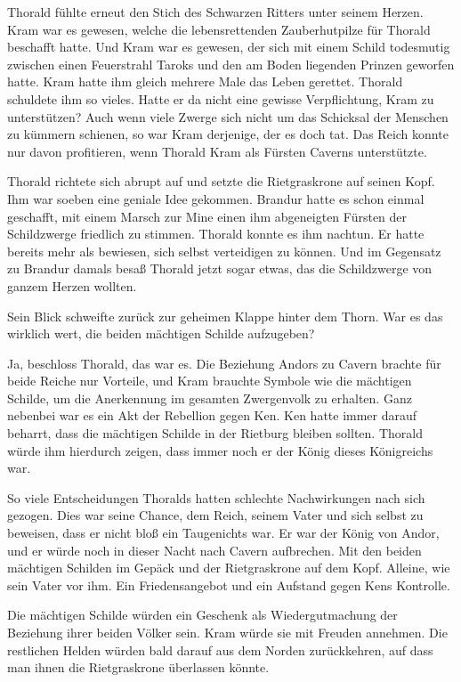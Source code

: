 Thorald fühlte erneut den Stich des Schwarzen Ritters unter seinem Herzen. Kram war es gewesen, welche die lebensrettenden Zauberhutpilze für Thorald beschafft hatte. Und Kram war es gewesen, der sich mit einem Schild todesmutig zwischen einen Feuerstrahl Taroks und den am Boden liegenden Prinzen geworfen hatte. Kram hatte ihm gleich mehrere Male das Leben gerettet. Thorald schuldete ihm so vieles. Hatte er da nicht eine gewisse Verpflichtung, Kram zu unterstützen? Auch wenn viele Zwerge sich nicht um das Schicksal der Menschen zu kümmern schienen, so war Kram derjenige, der es doch tat. Das Reich konnte nur davon profitieren, wenn Thorald Kram als Fürsten Caverns unterstützte.

Thorald richtete sich abrupt auf und setzte die Rietgraskrone auf seinen Kopf. Ihm war soeben eine geniale Idee gekommen. Brandur hatte es schon einmal geschafft, mit einem Marsch zur Mine einen ihm abgeneigten Fürsten der Schildzwerge friedlich zu stimmen. Thorald konnte es ihm nachtun. Er hatte bereits mehr als bewiesen, sich selbst verteidigen zu können. Und im Gegensatz zu Brandur damals besaß Thorald jetzt sogar etwas, das die Schildzwerge von ganzem Herzen wollten.

Sein Blick schweifte zurück zur geheimen Klappe hinter dem Thorn. War es das wirklich wert, die beiden mächtigen Schilde aufzugeben?

Ja, beschloss Thorald, das war es. Die Beziehung Andors zu Cavern brachte für beide Reiche nur Vorteile, und Kram brauchte Symbole wie die mächtigen Schilde, um die Anerkennung im gesamten Zwergenvolk zu erhalten. Ganz nebenbei war es ein Akt der Rebellion gegen Ken. Ken hatte immer darauf beharrt, dass die mächtigen Schilde in der Rietburg bleiben sollten. Thorald würde ihm hierdurch zeigen, dass immer noch er der König dieses Königreichs war.

So viele Entscheidungen Thoralds hatten schlechte Nachwirkungen nach sich gezogen. Dies war seine Chance, dem Reich, seinem Vater und sich selbst zu beweisen, dass er nicht bloß ein Taugenichts war. Er war der König von Andor, und er würde noch in dieser Nacht nach Cavern aufbrechen. Mit den beiden mächtigen Schilden im Gepäck und der Rietgraskrone auf dem Kopf. Alleine, wie sein Vater vor ihm. Ein Friedensangebot und ein Aufstand gegen Kens Kontrolle.

Die mächtigen Schilde würden ein Geschenk als Wiedergutmachung der Beziehung ihrer beiden Völker sein. Kram würde sie mit Freuden annehmen. Die restlichen Helden würden bald darauf aus dem Norden zurückkehren, auf dass man ihnen die Rietgraskrone überlassen könnte.

